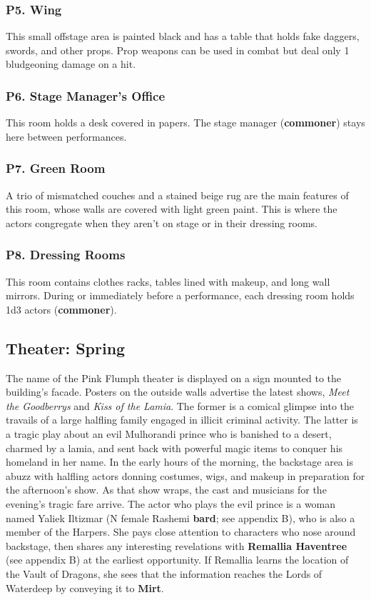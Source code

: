 \documentclass[10pt,a4paper,twoside,twocolumn,openany,nodeprecatedcode]{dndbook}
\begin{document}
\subsubsection{P5. Wing}
This small offstage area is painted black and has a table that holds fake daggers, swords, and other props. Prop weapons can be used in combat but deal only 1 bludgeoning damage on a hit.
\subsubsection{P6. Stage Manager's Office}
This room holds a desk covered in papers. The stage manager (\textbf{commoner}) stays here between performances.
\subsubsection{P7. Green Room}
A trio of mismatched couches and a stained beige rug are the main features of this room, whose walls are covered with light green paint. This is where the actors congregate when they aren't on stage or in their dressing rooms.
\subsubsection{P8. Dressing Rooms}
This room contains clothes racks, tables lined with makeup, and long wall mirrors. During or immediately before a performance, each dressing room holds 1d3 actors (\textbf{commoner}).
\subsection{Theater: Spring}
The name of the Pink Flumph theater is displayed on a sign mounted to the building's facade. Posters on the outside walls advertise the latest shows, \textit{Meet the Goodberrys} and \textit{Kiss of the Lamia}. The former is a comical glimpse into the travails of a large halfling family engaged in illicit criminal activity. The latter is a tragic play about an evil Mulhorandi prince who is banished to a desert, charmed by a lamia, and sent back with powerful magic items to conquer his homeland in her name.
In the early hours of the morning, the backstage area is abuzz with halfling actors donning costumes, wigs, and makeup in preparation for the afternoon's show. As that show wraps, the cast and musicians for the evening's tragic fare arrive. The actor who plays the evil prince is a woman named Yaliek Iltizmar (N female Rashemi \textbf{bard}; see appendix B), who is also a member of the Harpers. She pays close attention to characters who nose around backstage, then shares any interesting revelations with \textbf{Remallia Haventree} (see appendix B) at the earliest opportunity. If Remallia learns the location of the Vault of Dragons, she sees that the information reaches the Lords of Waterdeep by conveying it to \textbf{Mirt}.
\end{document}
